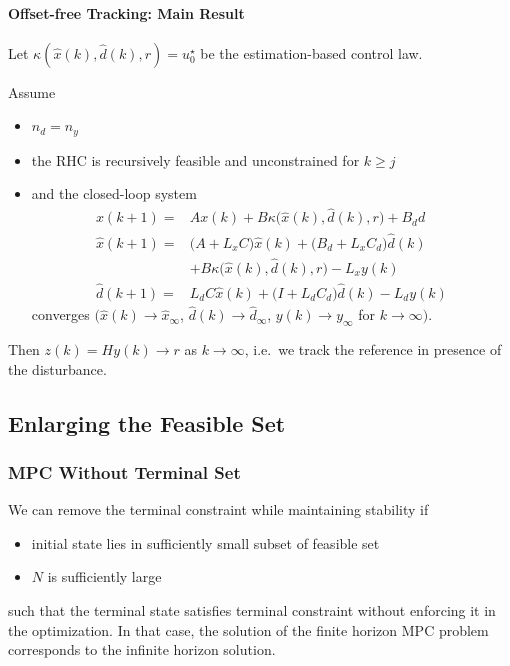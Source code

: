 \paragraph{Offset-free Tracking: Main Result}

Let $\kappa(\widehat{x}(k), \widehat{d}(k), r) = u_0^\star$ be the estimation-based control law.

Assume
\begin{itemize}
    \item $n_d = n_y$
    \item the RHC is recursively feasible and unconstrained for $k \geq j$
    \item and the closed-loop system
          \begin{align*}
              x(k+1)        =     & Ax(k) + B \kappa\bigl(\widehat{x}(k), \widehat{d}(k), r\bigr) + B_d d           \\
              \widehat{x}(k+1)  = & \bigl(A + L_x C\bigr) \widehat{x}(k) + \bigl(B_d + L_x C_d\bigr) \widehat{d}(k) \\
                                  & + B \kappa\bigl(\widehat{x}(k), \widehat{d}(k), r\bigr) - L_x y(k)              \\
              \widehat{d}(k+1)  = & L_d C \widehat{x}(k) + \bigl(I + L_d C_d\bigr) \widehat{d}(k) - L_d y(k)
          \end{align*}
          converges $\bigl(\widehat{x}(k)\rightarrow \widehat{x}_{\infty}$, $\widehat{d}(k)\rightarrow \widehat{d}_{\infty}$, $y(k)\rightarrow y_{\infty}$ for $k\rightarrow \infty\bigr)$.
\end{itemize}
Then $z(k) = Hy(k) \to r$ as $k \to \infty$, i.e.\ we track the reference in presence of the disturbance.

\subsection{Enlarging the Feasible Set}
\subsubsection{MPC Without Terminal Set}

We can remove the terminal constraint while maintaining stability if
\begin{itemize}
    \item initial state lies in sufficiently small subset of feasible set
    \item $N$ is sufficiently large
\end{itemize}
such that the terminal state satisfies terminal constraint without enforcing it in the optimization.
\newpar{}
In that case, the solution of the finite horizon MPC problem corresponds to the infinite horizon solution.

